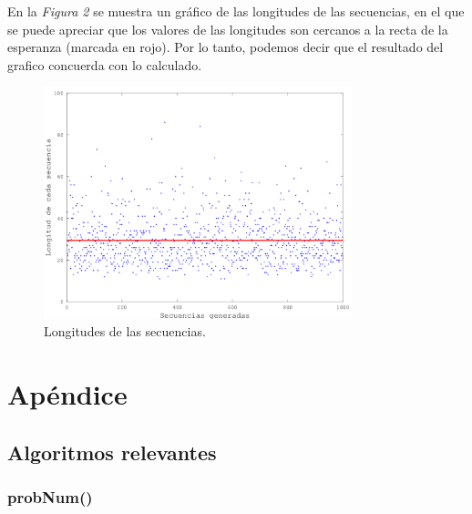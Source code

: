 \documentclass{article}
\begin{document}
\bigskip
En la \textit{Figura 2} se muestra un gráfico de las longitudes de las secuencias, en el que se puede apreciar que los valores de las longitudes son cercanos a la recta de la esperanza (marcada en rojo). Por lo tanto, podemos decir que el resultado del grafico concuerda con lo calculado. \\

\begin{figure}[h]
	\centering
	\includegraphics[width=0.80\textwidth]{images/longitudes.png}
	\caption{Longitudes de las secuencias.}
\end{figure}
\bigskip


\section{Apéndice}
\subsection{Algoritmos relevantes}
\subsubsection{probNum()}
\end{document}
